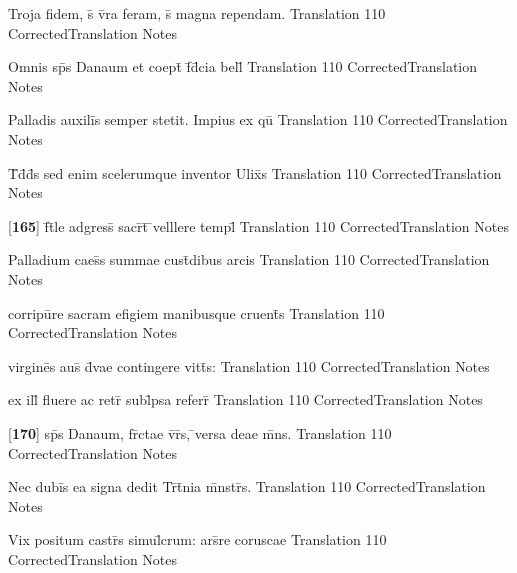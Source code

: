 \latline
  {Troja fidem, s\={\macron {\i}} v\={}ra feram, s\={\macron {\i}} magna rependam.}
  { Translation }
  {110}
  { CorrectedTranslation }
  { Notes }


\latline
  {Omnis sp\={}s Danaum et coept\={\macron {\i}} f\={\macron {\i}}d\={}cia bell\={\macron {\i}}}
  { Translation }
  {110}
  { CorrectedTranslation }
  { Notes }


\latline
  {Palladis auxili\={\macron {\i}}s semper stetit.  Impius ex qu\={}}
  { Translation }
  {110}
  { CorrectedTranslation }
  { Notes }


\latline
  {T\={}d\={\macron {\i}}d\={}s sed enim scelerumque inventor Ulix\={}s}
  { Translation }
  {110}
  { CorrectedTranslation }
  { Notes }


\latline
  {[\textbf{165}] f\={}t\={}le adgress\={\macron {\i}} sacr\={}t\={} \={}velllere templ\={}}
  { Translation }
  {110}
  { CorrectedTranslation }
  { Notes }


\latline
  {Palladium caes\={\macron {\i}}s summae cust\={}dibus arcis}
  { Translation }
  {110}
  { CorrectedTranslation }
  { Notes }


\latline
  {corripu\={}re sacram efigiem manibusque cruent\={\macron {\i}}s}
  { Translation }
  {110}
  { CorrectedTranslation }
  { Notes }


\latline
  {virgine\={}s aus\={\macron {\i}} d\={\macron {\i}}vae contingere vitt\={}s:}
  { Translation }
  {110}
  { CorrectedTranslation }
  { Notes }


\latline
  {ex ill\={} fluere ac retr\={} subl\={}psa referr\={\macron {\i}}}
  { Translation }
  {110}
  { CorrectedTranslation }
  { Notes }


\latline
  {[\textbf{170}] sp\={}s Danaum, fr\={}ctae v\={\macron {\i}}r\={}s, \={}versa deae m\={}ns.}
  { Translation }
  {110}
  { CorrectedTranslation }
  { Notes }


\latline
  {Nec dubi\={\macron {\i}}s ea signa dedit Tr\={\macron {\i}}t\={}nia m\={}nstr\={\macron {\i}}s.}
  { Translation }
  {110}
  { CorrectedTranslation }
  { Notes }


\latline
  {Vix positum castr\={\macron {\i}}s simul\={}crum: ars\={}re coruscae}
  { Translation }
  {110}
  { CorrectedTranslation }
  { Notes }


